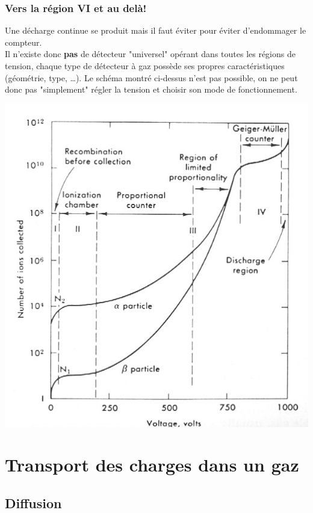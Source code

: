 	\subsubsection{Vers la région VI et au delà!}
	Une décharge continue se produit mais il faut éviter pour éviter d'endommager le compteur.\\
	
	Il n'existe donc \textbf{pas} de détecteur "universel" opérant dans toutes les régions de 
	tension, chaque type de détecteur à gaz possède ses propres caractéristiques (géométrie, type, 
	\dots). Le schéma montré ci-dessus n'est pas possible, on ne peut donc pas "simplement" régler 
	la tension et choisir son mode de fonctionnement.
	
	\begin{center}
	\includegraphics[scale=0.3]{ch8/image1}
	\end{center}
	
\section{Transport des charges dans un gaz}%
	\subsection{Diffusion}
